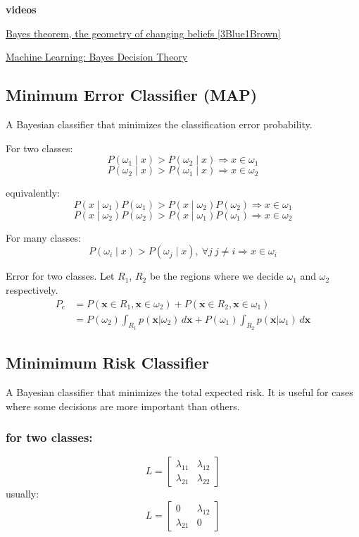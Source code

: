 \documentclass{article}
\begin{document}
\begin{multicols}{2}
\begin{mdframed}
	\textbf{videos}

	\href{https://www.youtube.com/watch?v=HZGCoVF3YvM}{Bayes theorem, the geometry of changing beliefs [3Blue1Brown]}

	\href{https://www.youtube.com/watch?v=4JscUHGWaB4}{Machine Learning: Bayes Decision Theory}
\end{mdframed}

\subsection{Minimum Error Classifier (MAP)}
A Bayesian classifier that minimizes the classification error probability.

For two classes:
\[P(\omega_1 \mid x) > P(\omega_2 \mid x) \Rightarrow x \in \omega_1\]
\[P(\omega_2 \mid x) > P(\omega_1 \mid x) \Rightarrow x \in \omega_2\]

equivalently:
\[P(x \mid \omega_1)P(\omega_1) > P(x \mid \omega_2)P(\omega_2) \Rightarrow x \in \omega_1\]
\[P(x \mid \omega_2)P(\omega_2) > P(x \mid \omega_1)P(\omega_1) \Rightarrow x \in \omega_2\]

For many classes:
\[P(\omega_i \mid x) > P(\omega_j \mid x),\ \forall j\ j \neq i \Rightarrow x \in \omega_i\]

Error for two classes. Let $R_1$, $R_2$ be the regions where we decide $\omega_1$ and $\omega_2$ respectively.
\[\begin{split}
	P_e &= P(\symbf{x} \in R_1, \symbf{x} \in \omega_2) + P(\symbf{x} \in R_2, \symbf{x} \in \omega_1) \\
	&= P(\omega_2) \int_{R_1} p(\symbf{x}|\omega_2) \, d\symbf{x} + P(\omega_1) \int_{R_2} p(\symbf{x}|\omega_1) \, d\symbf{x}
\end{split}\]

\subsection{Minimimum Risk Classifier}
A Bayesian classifier that minimizes the total expected risk. It is useful for cases where some decisions are more important than others.

\subsubsection*{for two classes:}
\[L = \begin{bmatrix}
	\lambda_{11} & \lambda_{12} \\
	\lambda_{21} & \lambda_{22}
\end{bmatrix}\]
usually:
\[L = \begin{bmatrix}
	0 & \lambda_{12} \\
	\lambda_{21} & 0
\end{bmatrix}\]


\end{multicols}
\end{document}

